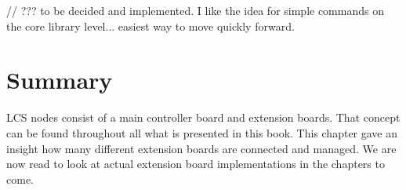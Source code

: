 // ??? to be decided and implemented. I like the idea for simple commands on the core library level... easiest way to move quickly forward.

\section{Summary}

LCS nodes consist of a main controller board and extension boards. That concept can be found throughout all what is presented in this book. This chapter gave an insight how many different extension boards are connected and managed. We are now read to look at actual extension board implementations in the chapters to come.

